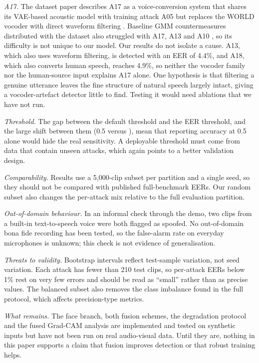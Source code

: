 \documentclass[conference]{IEEEtran}
\begin{document}
\emph{A17.} The dataset paper describes A17 as a voice-conversion system that shares its VAE-based acoustic model with training attack A05 but replaces the WORLD vocoder with direct waveform filtering \cite{wang2020asvspoof}. Baseline GMM countermeasures distributed with the dataset also struggled with A17, A13 and A10 \cite{wang2020asvspoof}, so its difficulty is not unique to our model. Our results do not isolate a cause. A13, which also uses waveform filtering, is detected with an EER of 4.4\%, and A18, which also converts human speech, reaches 4.9\%, so neither the vocoder family nor the human-source input explains A17 alone. One hypothesis is that filtering a genuine utterance leaves the fine structure of natural speech largely intact, giving a vocoder-artefact detector little to find. Testing it would need ablations that we have not run.

\emph{Threshold.} The gap between the default threshold and the EER threshold, and the large shift between them (0.5 versus \EERthr), mean that reporting accuracy at 0.5 alone would hide the real sensitivity. A deployable threshold must come from data that contain unseen attacks, which again points to a better validation design.

\emph{Comparability.} Results use a 5{,}000-clip subset per partition and a single seed, so they should not be compared with published full-benchmark EERs. Our random subset also changes the per-attack mix relative to the full evaluation partition.

\emph{Out-of-domain behaviour.} In an informal check through the demo, two clips from a built-in text-to-speech voice were both flagged as spoofed. No out-of-domain bona fide recording has been tested, so the false-alarm rate on everyday microphones is unknown; this check is not evidence of generalisation.

\emph{Threats to validity.} Bootstrap intervals reflect test-sample variation, not seed variation. Each attack has fewer than 210 test clips, so per-attack EERs below 1\% rest on very few errors and should be read as ``small'' rather than as precise values. The balanced subset also removes the class imbalance found in the full protocol, which affects precision-type metrics.

\emph{What remains.} The face branch, both fusion schemes, the degradation protocol and the fused Grad-CAM analysis are implemented and tested on synthetic inputs but have not been run on real audio-visual data. Until they are, nothing in this paper supports a claim that fusion improves detection or that robust training helps.
\end{document}
